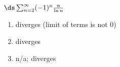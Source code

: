 {$\ds \sum_{n=2}^\infty (-1)^n\frac{n}{\ln n }$
}
{\begin{enumerate}
	\item diverges (limit of terms is not 0)
	\item	diverges 
	\item n/a; diverges
\end{enumerate}
}
